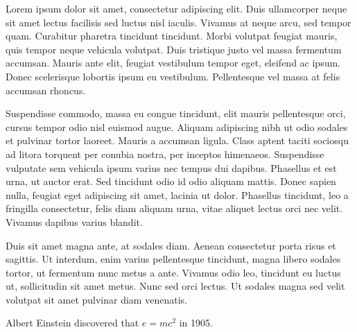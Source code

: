 \documentclass[10pt,letter,sans,final,colorlinks,linkcolor=true]{moderncv}
\begin{document}
Lorem ipsum dolor sit amet, consectetur adipiscing elit. Duis ullamcorper neque sit amet lectus facilisis sed luctus nisl iaculis. Vivamus at neque arcu, sed tempor quam. Curabitur pharetra tincidunt tincidunt. Morbi volutpat feugiat mauris, quis tempor neque vehicula volutpat. Duis tristique justo vel massa fermentum accumsan. Mauris ante elit, feugiat vestibulum tempor eget, eleifend ac ipsum. Donec scelerisque lobortis ipsum eu vestibulum. Pellentesque vel massa at felis accumsan rhoncus.

Suspendisse commodo, massa eu congue tincidunt, elit mauris pellentesque orci, cursus tempor odio nisl euismod augue. Aliquam adipiscing nibh ut odio sodales et pulvinar tortor laoreet. Mauris a accumsan ligula. Class aptent taciti sociosqu ad litora torquent per conubia nostra, per inceptos himenaeos. Suspendisse vulputate sem vehicula ipsum varius nec tempus dui dapibus. Phasellus et est urna, ut auctor erat. Sed tincidunt odio id odio aliquam mattis. Donec sapien nulla, feugiat eget adipiscing sit amet, lacinia ut dolor. Phasellus tincidunt, leo a fringilla consectetur, felis diam aliquam urna, vitae aliquet lectus orci nec velit. Vivamus dapibus varius blandit.

Duis sit amet magna ante, at sodales diam. Aenean consectetur porta risus et sagittis. Ut interdum, enim varius pellentesque tincidunt, magna libero sodales tortor, ut fermentum nunc metus a ante. Vivamus odio leo, tincidunt eu luctus ut, sollicitudin sit amet metus. Nunc sed orci lectus. Ut sodales magna sed velit volutpat sit amet pulvinar diam venenatis.

Albert Einstein discovered that $e=mc^2$ in 1905.


\makeletterclosing
\end{document}
